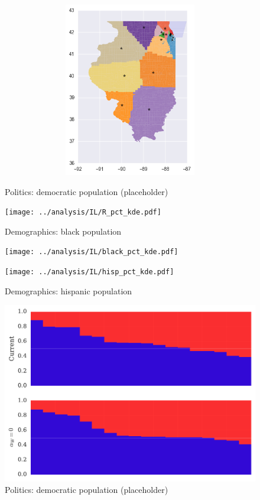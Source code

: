 \begin{figure}[htb!]
\includegraphics[width=5in,height=3in,keepaspectratio]{../maps/IL/static/0_25_after.png}
\end{figure}

\clearpage
\newpage

\begin{figure}[htb!] \centering
\caption{ Politics: democratic population (placeholder)}
\texttt{[image: ../analysis/IL/R\_pct\_kde.pdf]}
\caption{ Demographics: black population }
\texttt{[image: ../analysis/IL/black\_pct\_kde.pdf]}
\caption{ Demographics: hispanic population }
\texttt{[image: ../analysis/IL/hisp\_pct\_kde.pdf]}
\end{figure}

\clearpage
\newpage

\begin{figure}[htb!] \centering
\caption{ Politics: democratic population (placeholder)}
\includegraphics[width=6in]{../analysis/IL/barplot.pdf}
\end{figure}

